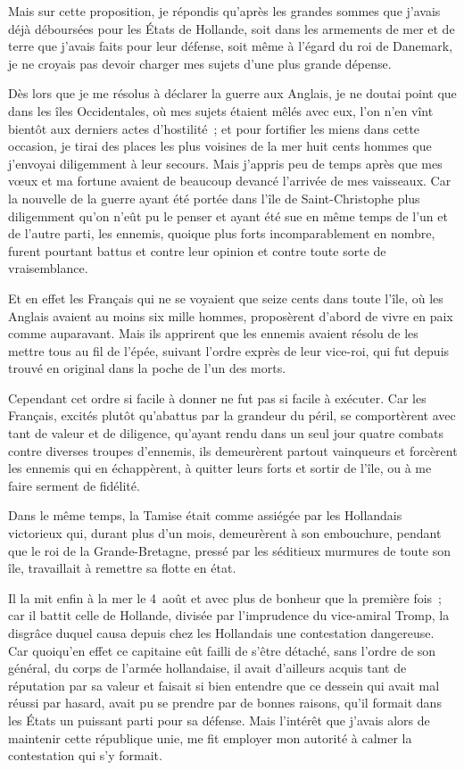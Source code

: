 \documentclass[french,twoside]{book} %
\begin{document}
Mais sur cette proposition, je répondis qu’après les grandes sommes que j’avais déjà déboursées pour les États de Hollande, soit dans les armements de mer et de terre que j’avais faits pour leur défense, soit même à l’égard du roi de Danemark, je ne croyais pas devoir charger mes sujets d’une plus grande dépense.\par
Dès lors que je me résolus à déclarer la guerre aux Anglais, je ne doutai point que dans les îles Occidentales, où mes sujets étaient mêlés avec eux, l’on n’en vînt bientôt aux derniers actes d’hostilité ; et pour fortifier les miens dans cette occasion, je tirai des places les plus voisines de la mer huit cents hommes que j’envoyai diligemment à leur secours. Mais j’appris peu de temps après que mes vœux et ma fortune avaient de beaucoup devancé l’arrivée de mes vaisseaux. Car la nouvelle de la guerre ayant été portée dans l’île de Saint-Christophe plus diligemment qu’on n’eût pu le penser et ayant été sue en même temps de l’un et de l’autre parti, les ennemis, quoique plus forts incomparablement en nombre, furent pourtant battus et contre leur opinion et contre toute sorte de vraisemblance.\par
Et en effet les Français qui ne se voyaient que seize cents dans toute l’île, où les Anglais avaient au moins six mille hommes, proposèrent d’abord de vivre en paix comme auparavant. Mais ils apprirent que les ennemis avaient résolu de les mettre tous au fil de l’épée, suivant l’ordre exprès de leur vice-roi, qui fut depuis trouvé en original dans la poche de l’un des morts.\par
Cependant cet ordre si facile à donner ne fut pas si facile à exécuter. Car les Français, excités plutôt qu’abattus par la grandeur du péril, se comportèrent avec tant de valeur et de diligence, qu’ayant rendu dans un seul jour quatre combats contre diverses troupes d’ennemis, ils demeurèrent partout vainqueurs et forcèrent les ennemis qui en échappèrent, à quitter leurs forts et sortir de l’île, ou à me faire serment de fidélité.\par
Dans le même temps, la Tamise était comme assiégée par les Hollandais victorieux qui, durant plus d’un mois, demeurèrent à son embouchure, pendant que le roi de la Grande-Bretagne, pressé par les séditieux murmures de toute son île, travaillait à remettre sa flotte en état.\par
Il la mit enfin à la mer le 4 août et avec plus de bonheur que la première fois ; car il battit celle de Hollande, divisée par l’imprudence du vice-amiral Tromp, la disgrâce duquel causa depuis chez les Hollandais une contestation dangereuse. Car quoiqu’en effet ce capitaine eût failli de s’être détaché, sans l’ordre de son général, du corps de l’armée hollandaise, il avait d’ailleurs acquis tant de réputation par sa valeur et faisait si bien entendre que ce dessein qui avait mal réussi par hasard, avait pu se prendre par de bonnes raisons, qu’il formait dans les États un puissant parti pour sa défense. Mais l’intérêt que j’avais alors de maintenir cette république unie, me fit employer mon autorité à calmer la contestation qui s’y formait.\par
\end{document}
